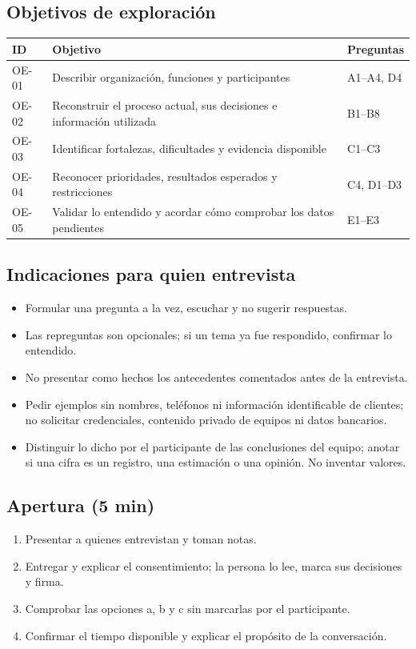\subsection*{Objetivos de exploraci\'on}
\noindent\begin{tabularx}{\linewidth}{@{}L{1.4cm}YL{2.2cm}@{}}
  \toprule
  \textbf{ID} & \textbf{Objetivo} & \textbf{Preguntas} \\
  \midrule
  OE-01 & Describir organizaci\'on, funciones y participantes & A1--A4, D4 \\
  OE-02 & Reconstruir el proceso actual, sus decisiones e informaci\'on utilizada & B1--B8 \\
  OE-03 & Identificar fortalezas, dificultades y evidencia disponible & C1--C3 \\
  OE-04 & Reconocer prioridades, resultados esperados y restricciones & C4, D1--D3 \\
  OE-05 & Validar lo entendido y acordar c\'omo comprobar los datos pendientes & E1--E3 \\
  \bottomrule
\end{tabularx}

\subsection*{Indicaciones para quien entrevista}
\begin{itemize}[nosep]
  \item Formular una pregunta a la vez, escuchar y no sugerir respuestas.
  \item Las repreguntas son opcionales; si un tema ya fue respondido, confirmar lo entendido.
  \item No presentar como hechos los antecedentes comentados antes de la entrevista.
  \item Pedir ejemplos sin nombres, tel\'efonos ni informaci\'on identificable de clientes; no
        solicitar credenciales, contenido privado de equipos ni datos bancarios.
  \item Distinguir lo dicho por el participante de las conclusiones del equipo; anotar si una
        cifra es un registro, una estimaci\'on o una opini\'on. No inventar valores.
\end{itemize}

\subsection*{Apertura (5 min)}
\begin{enumerate}[nosep]
  \item Presentar a quienes entrevistan y toman notas.
  \item Entregar y explicar el consentimiento; la persona lo lee, marca sus decisiones y firma.
  \item Comprobar las opciones a, b y c sin marcarlas por el participante.
  \item Confirmar el tiempo disponible y explicar el prop\'osito de la conversaci\'on.
\end{enumerate}

